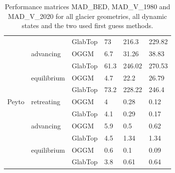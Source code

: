 \documentclass[journal abbreviation, manuscript]{copernicus}
\begin{document}
\begin{table}[]
\begin{tabular}{@{}llllll@{}}
                 &               & GlabTop            & 73               & 216.3                     & 229.82                    \\ \cmidrule(l){2-6} 
                 & advancing     & OGGM               & 6.7              & 31.26                     & 38.83                     \\
                 &               & GlabTop            & 61.3             & 246.02                    & 270.53                    \\ \cmidrule(l){2-6} 
                 & equilibrium   & OGGM               & 4.7              & 22.2                      & 26.79                     \\
                 &               & GlabTop            & 73.2             & 228.22                    & 246.4                     \\ \midrule
Peyto            & retreating    & OGGM               & 4                & 0.28                      & 0.12                      \\
                 &               & GlabTop            & 4.1              & 0.29                      & 0.17                      \\ \cmidrule(l){2-6} 
                 & advancing     & OGGM               & 5.9              & 0.5                       & 0.62                      \\
                 &               & GlabTop            & 4.5              & 1.34                      & 1.34                      \\ \cmidrule(l){2-6} 
                 & equilibrium   & OGGM               & 0.6              & 0.1                       & 0.09                      \\
                 &               & GlabTop            & 3.8              & 0.61                      & 0.64                      \\ \bottomrule
\end{tabular}
\caption{Performance matrices MAD\_BED, MAD\_V\_1980 and MAD\_V\_2020 for all glacier geometries, all dynamic states and the two used first guess methods.}
\label{tab:sup_fg_statistics}
\end{table}
\end{document}
